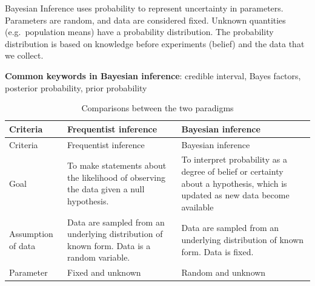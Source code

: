 \documentclass[
]{book}
\begin{document}
Bayesian Inference uses probability to represent uncertainty in parameters. Parameters are random, and data are considered fixed. Unknown quantities (e.g.~population means) have a probability distribution. The probability distribution is based on knowledge before experiments (belief) and the data that we collect.

\textbf{Common keywords in Bayesian inference}: credible interval, Bayes factors, posterior probability, prior probability

\begin{longtable}[]{@{}
  >{\raggedright\arraybackslash}p{}
  >{\raggedright\arraybackslash}p{}
  >{\raggedright\arraybackslash}p{}@{}}
\caption{\label{tab:compare} Comparisons between the two paradigms}\tabularnewline
\toprule\noalign{}
\begin{minipage}[b]{\linewidth}\raggedright
Criteria
\end{minipage} & \begin{minipage}[b]{\linewidth}\raggedright
Frequentist inference
\end{minipage} & \begin{minipage}[b]{\linewidth}\raggedright
Bayesian inference
\end{minipage} \\
\midrule\noalign{}
\endfirsthead
\toprule\noalign{}
\begin{minipage}[b]{\linewidth}\raggedright
Criteria
\end{minipage} & \begin{minipage}[b]{\linewidth}\raggedright
Frequentist inference
\end{minipage} & \begin{minipage}[b]{\linewidth}\raggedright
Bayesian inference
\end{minipage} \\
\midrule\noalign{}
\endhead
\bottomrule\noalign{}
\endlastfoot
Goal & To make statements about the likelihood of observing the data given a null hypothesis. & To interpret probability as a degree of belief or certainty about a hypothesis, which is updated as new data become available \\
Assumption of data & Data are sampled from an underlying distribution of known form. Data is a random variable. & Data are sampled from an underlying distribution of known form. Data is fixed. \\
Parameter & Fixed and unknown & Random and unknown \\

\end{longtable}
\end{document}
